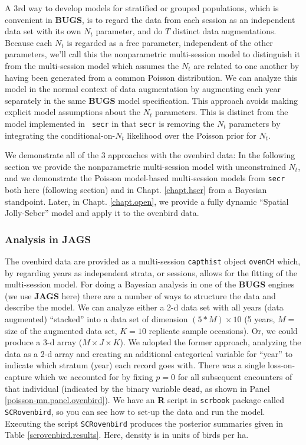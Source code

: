 A 3rd way to develop models for stratified or grouped populations, which is convenient in {\bf
  BUGS}, is to regard the data from each session as an independent
data set with its own $N_{t}$ parameter, and do $T$ distinct data augmentations. Because each $N_{t}$ is regarded
as a free parameter, independent of the other parameters, we'll call
this the nonparametric multi-session model to distinguish it from the
multi-session model which assumes the $N_{t}$ are related to one
another by having
been generated from a common Poisson distribution.  
We can analyze this model
in the normal context of data augmentation by augmenting each year
separately in the same {\bf BUGS} model specification. This approach
avoids making explicit model assumptions about the $N_{t}$
parameters.  This is distinct from the model implemented in \mbox{\tt
  secr} in that \mbox{\tt secr} is removing the $N_{t}$ parameters by
integrating the conditional-on-$N_{t}$ likelihood over the Poisson
prior for $N_{t}$.

We
demonstrate all of the 3 approaches with the ovenbird data: In the
following section we provide the nonparametric multi-session model with
unconstrained $N_{t}$,
 and we demonstrate  the Poisson model-based
multi-session models from \mbox{\tt secr} both here (following section) and in
Chapt. \ref{chapt.hscr} from a Bayesian standpoint.
Later, in Chapt. \ref{chapt.open}, we provide a fully dynamic  ``Spatial Jolly-Seber''
model and apply it to the ovenbird data.


\subsubsection{Analysis in JAGS}

The ovenbird data are provided as a multi-session \mbox{\tt capthist}
object \mbox{\tt ovenCH} which, by regarding years as independent
strata, or sessions, allows for the fitting of the multi-session model.  For doing
a Bayesian analysis in one of the {\bf BUGS} engines (we use {\bf
  JAGS} here) there are a number of ways to structure the data and
describe the model.  We can analyze either a 2-d data set with all
years (data augmented) ``stacked'' into a data set of dimension $(5*M)
\times 10$ (5 years, $M=$ size of the augmented data set, $K=10$
replicate sample occasions). Or, we could produce a 3-d array ($M \times J
\times K$). We adopted the former approach, analyzing the data as a
2-d array and creating an additional categorical  variable for ``year''
to indicate which stratum (year) each record goes with.  There was a
single loss-on-capture which we accounted for by fixing $p=0$ for all
subsequent encounters of that individual (indicated by the binary
variable \mbox{\tt dead}, as shown in Panel
\ref{poisson-mn.panel.ovenbird}).  We have an {\bf R} script in
\mbox{\tt scrbook} package called \mbox{\tt SCRovenbird}, so you can
see how to set-up the data and run the model.  Executing the script
\mbox{\tt SCRovenbird} produces the posterior summaries given in Table
\ref{scrovenbird.results}. Here, density is in units of birds per ha.


